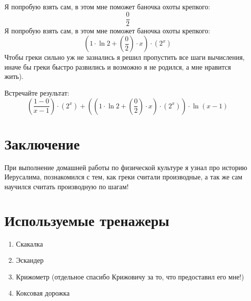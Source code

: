 \documentclass[a4paper,12pt]{article}
\begin{document}
Я попробую взять сам, в этом мне поможет баночка охоты крепкого:
\begin{equation}
\frac{0}{2} 
\end{equation} 
Я попробую взять сам, в этом мне поможет баночка охоты крепкого:
\begin{equation}
\left(1 \cdot \ln2+\left(\frac{0}{2} \right) \cdot x\right) \cdot \left(2^{x} \right)
\end{equation} 
Чтобы греки сильно уж не зазнались я решил пропустить все шаги вычисления, иначе бы греки быстро развились и возможно я не родился, а мне нравится жить).

 Встречайте результат:
\begin{equation}
\left(\frac{1-0}{x-1} \right) \cdot \left(2^{x} \right)+\left(\left(1 \cdot \ln2+\left(\frac{0}{2} \right) \cdot x\right) \cdot \left(2^{x} \right)\right) \cdot \ln(x-1) 
\end{equation} 
\section{Заключение}
 При выполнение домашней работы по физической культуре я узнал про историю Иерусалима, познакомился с тем, как греки считали производные, а так же сам научился считать производную по шагам!
\section{Используемые тренажеры}
 \begin{enumerate}
 \item Скакалка
 \item Эскандер
 \item Крижометр (отдельное спасибо Крижовичу за то, что предоставил его мне!)
 \item Коксовая дорожка
 \end{enumerate}
\end{document}
